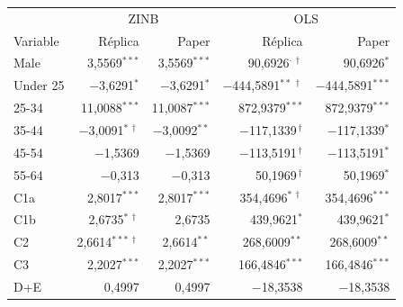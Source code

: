 \begin{tabular}{lrrrr}\toprule
 & \multicolumn{2}{c}{ZINB} & \multicolumn{2}{c}{OLS} \\
Variable & Réplica & Paper & Réplica & Paper \\\midrule
Male & 3,5569$^{***}$ & 3,5569$^{***}$ & 90,6926$^{\cdot\,\dagger}$ & 90,6926$^{*}$ \\
Under 25 & $-$3,6291$^{*}$ & $-$3,6291$^{*}$ & $-$444,5891$^{**\,\dagger}$ & $-$444,5891$^{***}$ \\
25-34 & 11,0088$^{***}$ & 11,0087$^{***}$ & 872,9379$^{***}$ & 872,9379$^{***}$ \\
35-44 & $-$3,0091$^{*\,\dagger}$ & $-$3,0092$^{**}$ & $-$117,1339$^{\,\dagger}$ & $-$117,1339$^{*}$ \\
45-54 & $-$1,5369 & $-$1,5369 & $-$113,5191$^{\,\dagger}$ & $-$113,5191$^{*}$ \\
55-64 & $-$0,313 & $-$0,313 & 50,1969$^{\,\dagger}$ & 50,1969$^{*}$ \\
C1a & 2,8017$^{***}$ & 2,8017$^{***}$ & 354,4696$^{*\,\dagger}$ & 354,4696$^{***}$ \\
C1b & 2,6735$^{*\,\dagger}$ & 2,6735 & 439,9621$^{*}$ & 439,9621$^{*}$ \\
C2 & 2,6614$^{***\,\dagger}$ & 2,6614$^{**}$ & 268,6009$^{**}$ & 268,6009$^{**}$ \\
C3 & 2,2027$^{***}$ & 2,2027$^{***}$ & 166,4846$^{***}$ & 166,4846$^{***}$ \\
D+E & 0,4997 & 0,4997 & $-$18,3538 & $-$18,3538 \\
\bottomrule\end{tabular}
